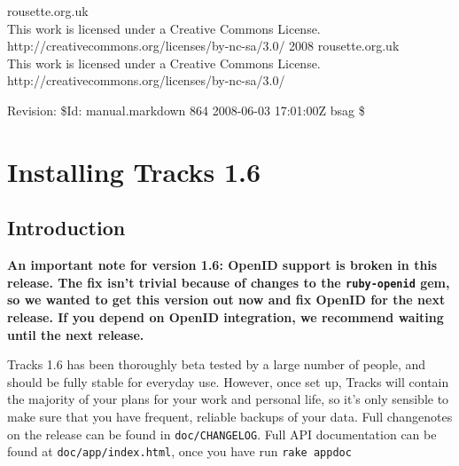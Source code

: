 \documentclass[10pt,twoside]{memoir}
\date{2008-04-07}
\title{\mytitle}
\author{\myauthor}
\def\mychapterstyle{BlueBox}
\def\mypagestyle{myruledpagestyle}
\def\revision{}
\def\mycopyright{2008 rousette.org.uk \\ This work is licensed under a Creative Commons License. \\ http://creativecommons.org/licenses/by-nc-sa/3.0/}
\def\revision{Revision: \$Id: manual.markdown 864 2008-06-03 17:01:00Z bsag \$}
\begin{document}
\chapterstyle{\mychapterstyle}
\pagestyle{\mypagestyle}

%
%

\frontmatter



\maketitle
\clearpage

\vspace*{\fill}

\setlength{\parindent}{0pt}

\ifx\mycopyright\undefined
\else
	\textcopyright{} \mycopyright
\fi

\revision

\begin{center}
\end{center}

\setlength{\parindent}{1em}
\clearpage

\tableofcontents


%
%


\setlength{\parindent}{0pt}
\setlength{\parskip}{\baselineskip/2}

\mainmatter
\chapter{Installing Tracks 1.6}
\label{installingtracks1.6}

\section{Introduction}
\label{introduction}

\textbf{An important note for version 1.6: OpenID support is broken in this release. The fix isn't trivial because of changes to the \texttt{ruby-openid} gem, so we wanted to get this version out now and fix OpenID for the next release. If you depend on OpenID integration, we recommend waiting until the next release.}


Tracks 1.6 has been thoroughly beta tested by a large number of people, and should be fully stable for everyday use. However, once set up, Tracks will contain the majority of your plans for your work and personal life, so it's only sensible to make sure that you have frequent, reliable backups of your data. Full changenotes on the release can be found in \texttt{doc/CHANGELOG}. Full API documentation can be found at \texttt{doc/app/index.html}, once you have run \texttt{rake appdoc}
\end{document}
